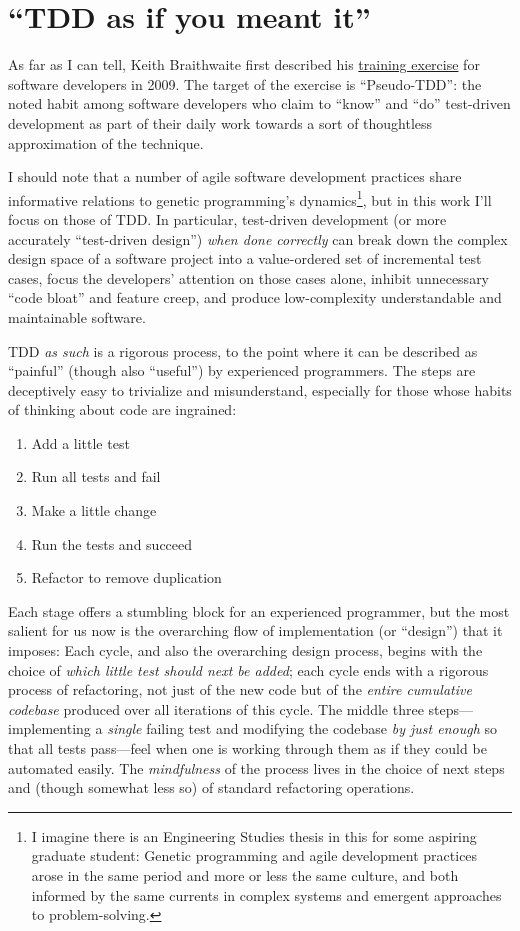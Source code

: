 \section{``TDD as if you meant it''}\hypertarget{tdd-as-if-you-meant-it}{}\label{tdd-as-if-you-meant-it}

As far as I can tell, Keith Braithwaite first described his \href{http://cumulative-hypotheses.org/2011/08/30/tdd-as-if-you-meant-it/}{training exercise} for software developers in 2009. The target of the exercise is ``Pseudo-TDD'': the noted habit among software developers who claim to ``know'' and ``do'' test-driven development as part of their daily work towards a sort of thoughtless approximation of the technique.

I should note that a number of agile software development practices share informative relations to genetic programming's dynamics\footnote{I imagine there is an Engineering Studies thesis in this for some aspiring graduate student: Genetic programming and agile development practices arose in the same period and more or less the same culture, and both informed by the same currents in complex systems and emergent approaches to problem-solving.}, but in this work I'll focus on those of TDD. In particular, test-driven development (or more accurately ``test-driven design'') \emph{when done correctly} can break down the complex design space of a software project into a value-ordered set of incremental test cases, focus the developers' attention on those cases alone, inhibit unnecessary ``code bloat'' and feature creep, and produce low-complexity understandable and maintainable software.

TDD \emph{as such} is a rigorous process, to the point where it can be described as ``painful'' (though also ``useful'') by experienced programmers. The steps are deceptively easy to trivialize and misunderstand, especially for those whose habits of thinking about code are ingrained:

\begin{enumerate}
\item Add a little test
\item Run all tests and fail
\item Make a little change
\item Run the tests and succeed
\item Refactor to remove duplication
\end{enumerate}

Each stage offers a stumbling block for an experienced programmer, but the most salient for us now is the overarching flow of implementation (or ``design'') that it imposes: Each cycle, and also the overarching design process, begins with the choice of \emph{which little test should next be added}; each cycle ends with a rigorous process of refactoring, not just of the new code but of the \emph{entire cumulative codebase} produced over all iterations of this cycle. The middle three steps---implementing a \emph{single} failing test and modifying the codebase \emph{by just enough} so that all tests pass---feel when one is working through them as if they could be automated easily. The \emph{mindfulness} of the process lives in the choice of next steps and (though somewhat less so) of standard refactoring operations.

